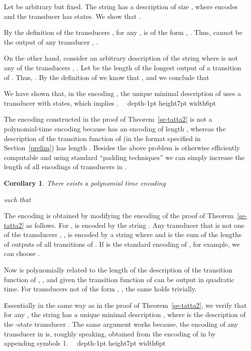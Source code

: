 \documentclass[copyright]{eptcs}
\def \prend{\vrule depth-1pt height7pt width6pt}
\def \proof{\bigbreak\noindent{\bf Proof.\ \ }}
\def \endpf{{\ \ \prend \medbreak}}
\newtheorem{corollary}{Corollary}[section]
\begin{document}
Let  be arbitrary but fixed. The string  has a description
 of size ,
where  encodes  and
the transducer  has  states.
We show that .

By the definition of the transducers , for any ,
 is of the form , . Thus,
 cannot be the output of any transducer , .

On the other hand, consider an
arbitrary description 
of the string  where  is not any
of the transducers , . Let  be the length
of the longest output of a transition of .
Thus, . By the definition of  we
know that , and we conclude that

We have shown that, in the encoding ,
the unique minimal description
of  uses a transducer with  states, which
implies .
\endpf

The encoding  constructed in the proof of Theorem~\ref{se-tatta2}
is not a polynomial-time encoding because  has an encoding
of length , whereas the description of the transition
function of  (in the format specified in Section~\ref{prelim})
has length . Besides  the above
problem  is otherwise efficiently computable and using  standard
``padding techniques'' we can simply increase the length of all
encodings of transducers in .

\begin{corollary}
\label{se-tatta3}
There exists a polynomial time encoding

such that

\end{corollary}

\proof
The encoding  is obtained by modifying the encoding  of
the proof of Theorem~\ref{se-tatta2} as follows. For ,
 is encoded by the string .
Any transducer  that is not one of the transducers , ,
is encoded by a string  where  and 
is the sum of the lengths of outputs of all transitions of . If
 is the standard encoding of , for example, we can choose
.

Now  is polynomially related to the length of the description
of the transition function of , , and given
 the transition function of  can be output in quadratic time.
For transducers not of the form , , the same holds trivially.

Essentially in the same way as in the proof of Theorem~\ref{se-tatta2},
we verify that for any , 
the string  has a unique minimal
description , where
 is the description of the -state
transducer . The same argument works because, the encoding
of any transducer  in  is, roughly speaking, obtained from
the encoding  of  in  by appending 
symbols 1.
\endpf
\end{document}
